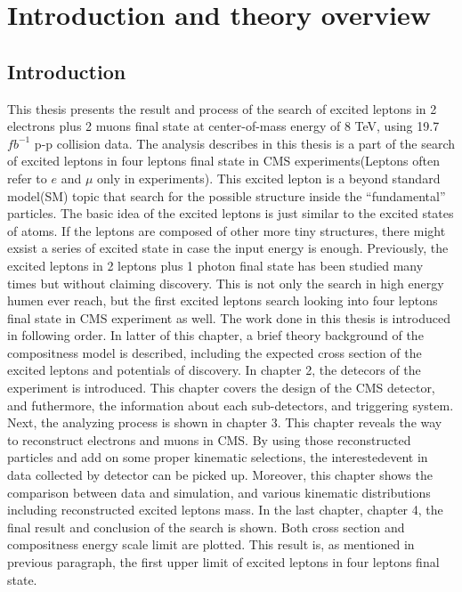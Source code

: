 \chapter{Introduction and theory overview}

\section{Introduction}
This thesis presents the result and process of the search of excited leptons in 2 electrons plus 2 muons final state at center-of-mass energy of 8 TeV, using 19.7 $fb^{-1}$ p-p collision data. The analysis describes in this thesis is a part of the search of excited leptons in four leptons final state in CMS experiments(Leptons often refer to $e$ and $\mu$ only in experiments). This excited lepton  is a beyond standard model(SM) topic that search for the possible structure inside the ``fundamental'' particles. The basic idea of the excited leptons is just similar to the excited states of atoms. If the leptons are composed of other more tiny structures, there might exsist a series of excited state in case the input energy is enough. Previously, the excited leptons in 2 leptons plus 1 photon final state has been studied many times but without claiming discovery\cite{tevatron1, tevatron2, tevatron3, tevatron4, EXO-10-016, an-11-452, an-12-013, atlas2011-limit}. This is not only the search in high energy humen ever reach, but the first excited leptons search looking into four leptons final state in CMS experiment as well.
\newline The work done in this thesis is introduced in following order. In latter of this chapter, a brief theory background of the compositness model is described, including the expected cross section of the excited leptons and potentials of discovery. In chapter 2, the detecors of the experiment is introduced. This chapter covers the design of the CMS detector, and futhermore, the information about each sub-detectors, and triggering system. Next, the analyzing process is shown in chapter 3. This chapter reveals the way to reconstruct electrons and muons in CMS. By using those reconstructed particles and add on some proper kinematic selections, the interestedevent in data collected by detector can be picked up. Moreover, this chapter shows the comparison between data and simulation, and various kinematic distributions including reconstructed excited leptons mass. In the last chapter, chapter 4, the final result and conclusion of the search is shown. Both cross section and compositness energy scale limit are plotted. This result is, as mentioned in previous paragraph, the first upper limit of excited leptons in four leptons final state.

